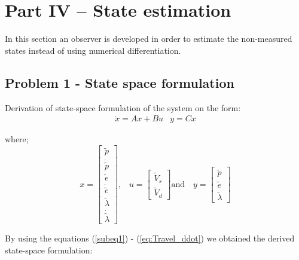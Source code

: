 \newpage
\section{Part IV – State estimation}
In this section an observer is developed in order to estimate the non-measured states instead of using numerical differentiation.
\subsection{Problem 1 - State space formulation}
Derivation of state-space formulation of the system on the form:
\begin{equation}\label{eq:state space}
    \begin{array}{l}
    \dot x = Ax + Bu
    & y = Cx
\end{array}
\end{equation}

where;
\begin{equation}
x = \left[ {\begin{array}{*{20}{c}}
{\tilde p}\\
{\dot \tilde p}\\
{\tilde e}\\
{\dot \tilde e}\\
{\tilde \lambda }\\
{\dot \tilde \lambda }
\end{array}} \right] \textrm{,} \quad  u = \left[ {\begin{array}{*{20}{c}}
{{{\tilde V}_s}}\\
{{{\tilde V}_d}}
\end{array}} \right] \textrm{and} \quad y = \left[ {\begin{array}{*{20}{c}}
{\tilde p}\\
{\tilde e}\\
{\tilde \lambda }
\end{array}} \right]
\end{equation}

By using the equations (\ref{subeq1}) -  (\ref{eq:Travel_ddot}) we obtained the derived state-space formulation:

